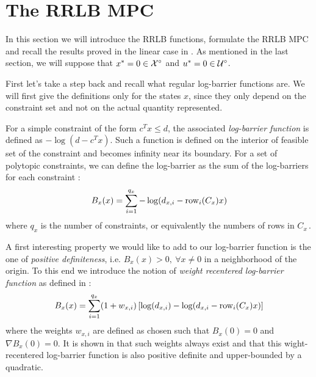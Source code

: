 \documentclass[12pt]{article}
\begin{document}
\section{The RRLB MPC}\label{sec:RRLB-MPC}

In this section we will introduce the RRLB functions, formulate the RRLB MPC and recall the results proved in the linear case in \cite{RRLB-linear-MPC}.
As mentioned in the last section, we will suppose that $x^*=0\in\cal{X}^\circ$ and $u^*=0\in\cal{U}^\circ$.

\vspace{12pt}

First let's take a step back and recall what regular log-barrier functions are.
We will first give the definitions only for the states $x$, since they only depend on the constraint set and not on the actual quantity represented.

For a simple constraint of the form $c^Tx\leq d$, the associated \textit{log-barrier function} is defined as $-\log(d-c^Tx)$.
Such a function is defined on the interior of feasible set of the constraint and becomes infinity near its boundary.
For a set of polytopic constraints, we can define the log-barrier as the sum of the log-barriers for each constraint :
$$B_x(x)=\sum_{i=1}^{q_x}-\log(d_{x,i}-\rm{row}_i(C_x)x)$$
where $q_x$ is the number of constraints, or equivalently the numbers of rows in $C_x$\,.

A first interesting property we would like to add to our log-barrier function is the one of \textit{positive definiteness}, i.e. $B_x(x)>0,~\forall x\neq 0$ in a neighborhood of the origin.
To this end we introduce the notion of \textit{weight recentered log-barrier function} as defined in \cite{RLB} :
$$B_x(x)=\sum_{i=1}^{q_x}(1+w_{x,i})\left[\log(d_{x,i})-\log(d_{x,i}-\rm{row}_i(C_x)x)\right]$$
where the weights $w_{x,i}$ are defined as chosen such that $B_x(0)=0$ and $\nabla B_x(0)=0$.
It is shown in \cite{RLB} that such weights always exist and that this wight-recentered log-barrier function is also positive definite and upper-bounded by a quadratic.
\end{document}
